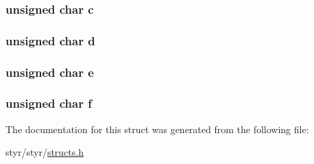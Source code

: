 \subsubsection[{\texorpdfstring{c}{c}}]{\setlength{\rightskip}{0pt plus 5cm}unsigned char c}\hypertarget{structsix__uchar_a089aacf63ed94ae0e667bb8f6db3e853}{}\label{structsix__uchar_a089aacf63ed94ae0e667bb8f6db3e853}
\subsubsection[{\texorpdfstring{d}{d}}]{\setlength{\rightskip}{0pt plus 5cm}unsigned char d}\hypertarget{structsix__uchar_aef7bd9bb1f716afb151a4b4206d468f3}{}\label{structsix__uchar_aef7bd9bb1f716afb151a4b4206d468f3}
\subsubsection[{\texorpdfstring{e}{e}}]{\setlength{\rightskip}{0pt plus 5cm}unsigned char e}\hypertarget{structsix__uchar_a78b0af8eb57f2f240016ee37529c6f47}{}\label{structsix__uchar_a78b0af8eb57f2f240016ee37529c6f47}
\subsubsection[{\texorpdfstring{f}{f}}]{\setlength{\rightskip}{0pt plus 5cm}unsigned char f}\hypertarget{structsix__uchar_a7ceb8bf372a716e22ab056d1b7df49e7}{}\label{structsix__uchar_a7ceb8bf372a716e22ab056d1b7df49e7}


The documentation for this struct was generated from the following file\+:\begin{DoxyCompactItemize}
\item 
styr/styr/\hyperlink{structs_8h}{structs.\+h}\end{DoxyCompactItemize}
